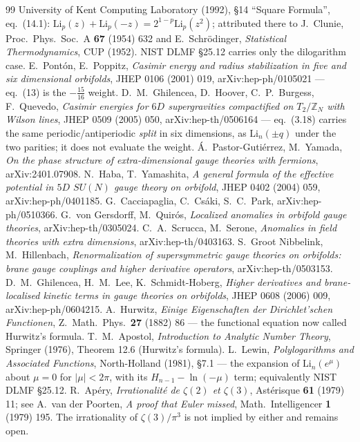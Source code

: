 \documentclass[11pt,a4paper]{article}
\newcommand{\ZZ}{\mathbb{Z}}
\begin{document}
\begin{thebibliography}{99}
University of Kent Computing Laboratory (1992), \S14 ``Square Formula'', eq.~(14.1):
$\mathrm{Li}_p(z)+\mathrm{Li}_p(-z)=2^{1-p}\mathrm{Li}_p(z^2)$; attributed there to J.~Clunie,
Proc.\ Phys.\ Soc.\ A \textbf{67} (1954) 632 and E.~Schr\"odinger, \emph{Statistical
Thermodynamics}, CUP (1952). NIST DLMF \S25.12 carries only the dilogarithm case.
 E.~Pont\'on, E.~Poppitz, \emph{Casimir energy and radius stabilization in five and
six dimensional orbifolds}, JHEP 0106 (2001) 019, arXiv:hep-ph/0105021 --- eq.~(13) is the
$-\tfrac{15}{16}$ weight.
 D.~M.~Ghilencea, D.~Hoover, C.~P.~Burgess, F.~Quevedo, \emph{Casimir energies for
$6D$ supergravities compactified on $T_2/\ZZ_N$ with Wilson lines}, JHEP 0509 (2005) 050,
arXiv:hep-th/0506164 --- eq.~(3.18) carries the same periodic/antiperiodic \emph{split} in six
dimensions, as $\mathrm{Li}_n(\pm q)$ under the two parities; it does not evaluate the weight.
 \'A.~Pastor-Guti\'errez, M.~Yamada, \emph{On the phase structure of
extra-dimensional gauge theories with fermions}, arXiv:2401.07908.
 N.~Haba, T.~Yamashita, \emph{A general formula of the effective potential in $5D$
$SU(N)$ gauge theory on orbifold}, JHEP 0402 (2004) 059, arXiv:hep-ph/0401185.
 G.~Cacciapaglia, C.~Cs\'aki, S.~C.~Park, arXiv:hep-ph/0510366.
 G.~von Gersdorff, M.~Quir\'os, \emph{Localized anomalies in orbifold gauge
theories}, arXiv:hep-th/0305024.
 C.~A.~Scrucca, M.~Serone, \emph{Anomalies in field theories with extra dimensions},
arXiv:hep-th/0403163.
 S.~Groot Nibbelink, M.~Hillenbach, \emph{Renormalization of supersymmetric gauge
theories on orbifolds: brane gauge couplings and higher derivative operators},
arXiv:hep-th/0503153.
 D.~M.~Ghilencea, H.~M.~Lee, K.~Schmidt-Hoberg, \emph{Higher derivatives and
brane-localised kinetic terms in gauge theories on orbifolds}, JHEP 0608 (2006) 009,
arXiv:hep-ph/0604215.
 A.~Hurwitz, \emph{Einige Eigenschaften der Dirichlet'schen Functionen}, Z.\ Math.\ Phys.\ \textbf{27} (1882) 86 --- the functional equation now called Hurwitz's formula.
 T.~M.~Apostol, \emph{Introduction to Analytic Number Theory}, Springer (1976), Theorem 12.6 (Hurwitz's formula).
 L.~Lewin, \emph{Polylogarithms and Associated Functions}, North-Holland (1981), \S7.1 --- the expansion of $\mathrm{Li}_n(e^{\mu})$ about $\mu=0$ for $|\mu|<2\pi$, with its $H_{n-1}-\ln(-\mu)$ term; equivalently NIST DLMF \S25.12.
 R.~Ap\'ery, \emph{Irrationalit\'e de $\zeta(2)$ et $\zeta(3)$}, Ast\'erisque \textbf{61} (1979) 11; see A.~van der Poorten, \emph{A proof that Euler missed}, Math.\ Intelligencer \textbf{1} (1979) 195. The irrationality of $\zeta(3)/\pi^3$ is not implied by either and remains open.

\end{thebibliography}
\end{document}
